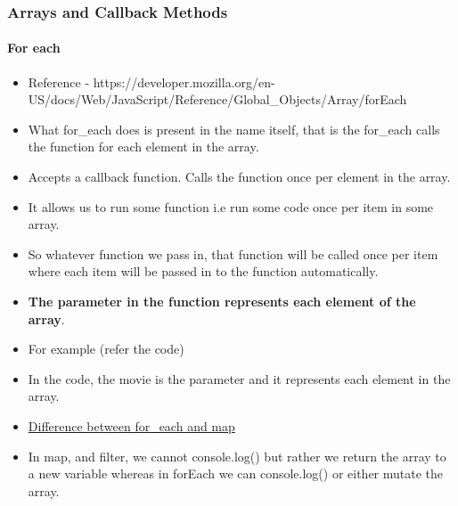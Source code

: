 \documentclass[
  paper=a4,
  ,captions=tableheading
]{scrartcl}
\providecommand{\tightlist}{%
  \setlength{\itemsep}{0pt}\setlength{\parskip}{0pt}}
\begin{document}
\hypertarget{arrays-and-callback-methods-1}{%
\subsubsection{Arrays and Callback
Methods}\label{arrays-and-callback-methods-1}}

\hypertarget{for-each-1}{%
\paragraph{For each}\label{for-each-1}}

\begin{itemize}
\tightlist
\item
  Reference -
  https://developer.mozilla.org/en-US/docs/Web/JavaScript/Reference/Global\_Objects/Array/forEach
\item
  What for\_each does is present in the name itself, that is the
  for\_each calls the function for each element in the array.
\item
  Accepts a callback function. Calls the function once per element in
  the array.
\item
  It allows us to run some function i.e run some code once per item in
  some array.
\item
  So whatever function we pass in, that function will be called once per
  item where each item will be passed in to the function automatically.
\item
  \textbf{The parameter in the function represents each element of the
  array}.
\item
  For example (refer the code)
\item
  In the code, the movie is the parameter and it represents each element
  in the array.
\item
  \href{https://codeburst.io/javascript-map-vs-foreach-f38111822c0f}{Difference
  between for\_each and map}
\item
  In map, and filter, we cannot console.log() but rather we return the
  array to a new variable whereas in forEach we can console.log() or
  either mutate the array.
\end{itemize}
\end{document}

